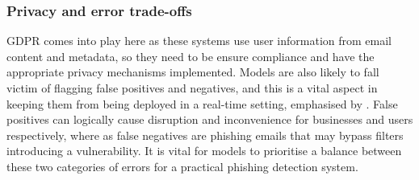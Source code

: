 
\subsubsection*{Privacy and error trade-offs}
GDPR comes into play here as these systems use user information from email content and metadata, so they need to be ensure compliance and have the appropriate privacy mechanisms implemented. Models are also likely to fall victim of flagging false positives and negatives, and this is a vital aspect in keeping them from being deployed in a real-time setting, emphasised by \cite{vishwanath2011people}. False positives can logically cause disruption and inconvenience for businesses and users respectively, where as false negatives are phishing emails that may bypass filters introducing a vulnerability. It is vital for models to prioritise a balance between these two categories of errors for a practical phishing detection system.
